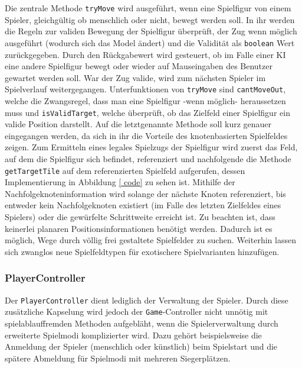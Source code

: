 \documentclass[conference]{IEEEtran}
\begin{document}
Die zentrale Methode \texttt{tryMove} wird ausgef\"uhrt, wenn eine Spielfigur von einem Spieler, gleichg\"ultig ob menschlich oder nicht, bewegt werden soll. In ihr werden die Regeln zur validen Bewegung der Spielfigur \"uberpr\"uft, der Zug wenn m\"oglich ausgef\"uhrt (wodurch sich das Model \"andert) und die Validit\"at als \texttt{boolean} Wert zur\"uckgegeben. Durch den R\"uckgabewert wird gesteuert, ob im Falle einer KI eine andere Spielfigur bewegt oder wieder auf Mauseingaben des Benutzer gewartet werden soll. War der Zug valide, wird zum n\"achsten Spieler im Spielverlauf weitergegangen. Unterfunktionen von \texttt{tryMove} sind \texttt{cantMoveOut}, welche die Zwangsregel, dass man eine Spielfigur -wenn m\"oglich- heraussetzen muss und
\texttt{isValidTarget}, welche \"uberpr\"uft, ob das Zielfeld einer Spielfigur ein valide Position darstellt. Auf die letztgenannte Methode soll kurz genauer eingegangen werden, da sich in ihr die Vorteile des knotenbasierten Spielfeldes zeigen. Zum Ermitteln eines legales Spielzugs der Spielfigur wird zuerst das Feld, auf dem die Spielfigur sich befindet, referenziert und nachfolgende die Methode \texttt{getTargetTile} auf dem referenzierten Spielfeld aufgerufen, dessen Implementierung in Abbildung \ref{ code} zu sehen ist. Mithilfe der Nachfolgeknoteninformation wird solange der n\"achste Knoten referenziert, bis entweder kein Nachfolgeknoten existiert (im Falle des letzten Zielfeldes eines Spielers) oder die gew\"urfelte Schrittweite erreicht ist.
Zu beachten ist, dass keinerlei planaren Positionsinformationen ben\"otigt werden. Dadurch ist es m\"oglich, Wege durch v\"ollig frei gestaltete Spielfelder
zu suchen. Weiterhin lassen sich zwanglos neue Spielfeldtypen f\"ur exotischere Spielvarianten hinzuf\"ugen.

\subsubsection{PlayerController}
     
Der \texttt{PlayerController} dient lediglich der Verwaltung der Spieler. Durch diese zus\"atzliche Kapselung wird jedoch der \texttt{Game}-Controller
nicht unn\"otig mit spielablauffremden Methoden aufgebl\"aht, wenn die Spielerverwaltung durch erweiterte Spielmodi komplizierter wird. Dazu geh\"ort beispielsweise die Anmeldung der Spieler (menschlich oder k\"unstlich) beim Spielstart und die sp\"atere Abmeldung f\"ur Spielmodi mit mehreren Siegerpl\"atzen.
\end{document}
